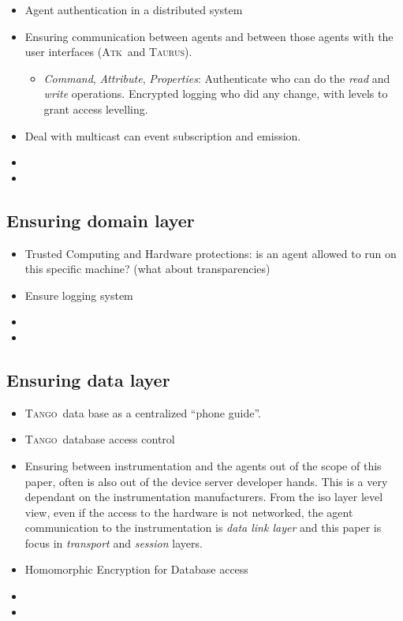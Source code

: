 \documentclass[10pt,a4paper,twoside]{llncs}
\newcommand{\tango}{\textsc{Tango}}
\newcommand{\taurus}{\textsc{Taurus}}
\newcommand{\atk}{\textsc{Atk}}
\begin{document}
\begin{itemize}
    \item Agent authentication in a distributed system
    \item Ensuring communication between agents and between those agents with the user interfaces (\atk\, and \taurus).
    \begin{itemize}
        \item \emph{Command}, \emph{Attribute}, \emph{Properties}: Authenticate who can do the \emph{read} and \emph{write} operations. Encrypted logging who did any change, with levels to grant access levelling.
    \end{itemize}
    \item Deal with multicast can event subscription and emission.
    \item 
    \item 
\end{itemize}

%
\subsection{Ensuring domain layer \label{sec:domainLayer}}

\begin{itemize}
    \item Trusted Computing and Hardware protections: is an agent allowed to run on this specific machine? (what about transparencies)
    \item Ensure logging system
    \item 
    \item
\end{itemize}

%
\subsection{Ensuring data layer \label{sec:dataLayer}}

\begin{itemize}
    \item \tango\, data base as a centralized ``phone guide''.
    \item \tango\, database access control
    \item Ensuring between instrumentation and the agents out of the scope of this paper, often is also out of the device server developer hands. This is a very dependant on the instrumentation manufacturers. From the iso layer level view, even if the access to the hardware is not networked, the agent communication to the instrumentation is \emph{data link layer} and this paper is focus in \emph{transport} and \emph{session} layers.
    \item Homomorphic Encryption for Database access
    \item  
    \item 
\end{itemize}
\end{document}
